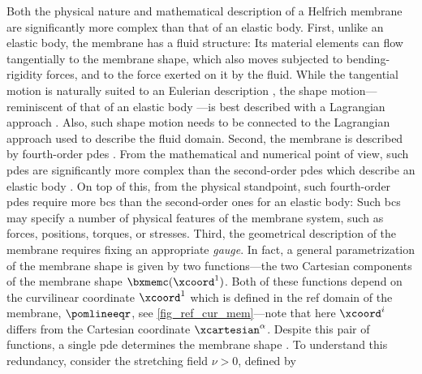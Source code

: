 Both the physical nature and mathematical description of a Helfrich membrane are significantly more complex than that of an elastic body. First, unlike an elastic body, the membrane has a fluid structure: Its material elements can  flow tangentially to the membrane shape, which also moves subjected to  bending-rigidity forces, and to the force exerted on it by the fluid.
While the tangential motion is naturally suited to an Eulerian description \cite{landauFluidMechanics1987}, the shape motion---reminiscent of that of an elastic body \cite{helfrichElasticPropertiesLipid1973}---is best described with a Lagrangian approach \cite{lacarbonaraNonlinearStructuralMechanics2013}.
Also, such shape motion needs to be connected to the Lagrangian approach used to describe the fluid domain. Second, the membrane is described by fourth-order \acp{pde} \cite{zhong-canBendingEnergyVesicle1989}. From  the mathematical and numerical point of view, such \acp{pde} are significantly more complex than the second-order \acp{pde} which describe an elastic body \cite{worthmullerIRENEFluIdLayeR2025}. On top of this, from the physical standpoint, such fourth-order \acp{pde} require more  \acp{bc} than the second-order ones for an elastic body: Such \acp{bc} may specify a number of physical features of the membrane system, such as forces, positions, torques, or stresses.
Third, the geometrical description of the membrane requires fixing an appropriate \textit{gauge}.
In fact, a general parametrization of the membrane shape is given by two functions---the two Cartesian components of the membrane shape $\bxmemc(\xcoord^1)$. Both of these functions  depend on the curvilinear coordinate $\xcoord^1$ which is defined in the \ac{ref} domain of the membrane, $\pomlineeqr$, see \cref{fig_ref_cur_mem}---note that here $\xcoord^i$ differs from the Cartesian coordinate $\xcartesian^\alpha$.
Despite this pair of functions, a single \ac{pde}  determines the membrane shape \cite{zhong-canBendingEnergyVesicle1989}.
To understand this redundancy, consider the  stretching field $\nu>0$, defined by


